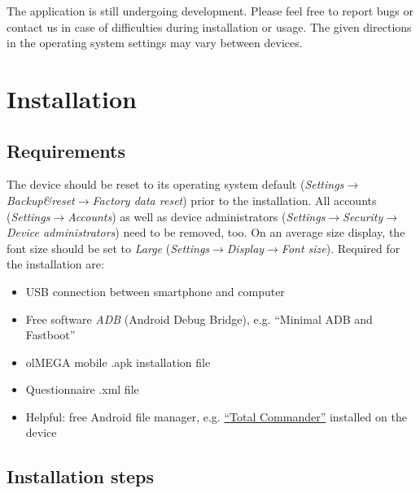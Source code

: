 \documentclass[11pt,a4paper,titlepage]{article}
\begin{document}
The application is still undergoing development. Please feel free to report bugs or contact us in case of difficulties during installation or usage. The given directions in the operating system settings may vary between devices.


\section{Installation}


\subsection{Requirements}

The device should be reset to its operating system default (\textit{Settings}$\rightarrow$\textit{Backup\&reset}$\rightarrow$\textit{Factory data reset}) prior to the installation. All accounts (\textit{Settings}$\rightarrow$\textit{Accounts}) as well as device administrators (\textit{Settings}$\rightarrow$\textit{Security}$\rightarrow$\textit{Device administrators}) need to be removed, too. On an average size display, the font size should be set to \textit{Large} (\textit{Settings}$\rightarrow$\textit{Display}$\rightarrow$\textit{Font size}). Required for the installation are:

\begin{itemize}
	\item USB connection between smartphone and computer
	\item Free software \textit{ADB} (Android Debug Bridge), e.g. ``Minimal ADB and Fastboot''
	\item olMEGA mobile .apk installation file
	\item Questionnaire .xml file
	\item Helpful: free Android file manager, e.g. \href{https://total-commander.de.uptodown.com/android}{``Total Commander''} installed on the device
\end{itemize}


\subsection{Installation steps}
\end{document}

